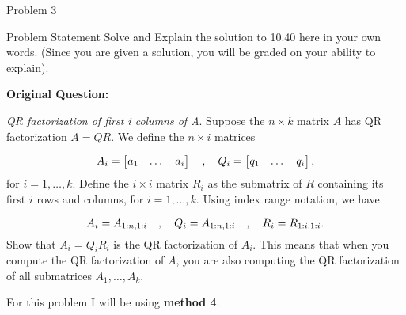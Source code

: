\begin{problem}{Problem 3}
    \begin{statement}{Problem Statement}
        Solve and Explain the solution to 10.40 here in your own words. (Since you are given a solution, you will be graded on your ability to explain). \vspace*{1em}

        \noindent \textbf{Original Question:} \vspace*{1em}

        \textit{QR factorization of first i columns of A}. Suppose the $n \times k$ matrix $A$ has QR factorization $A = QR$. We define the $n \times i$ matrices

        \setcounter{equation}{0}
        \begin{equation*}
            A_{i} = 
            \begin{bmatrix}
                a_{1} & \dots & a_{i}
            \end{bmatrix}
            \hspace*{10pt} , \hspace*{10pt}
            Q_{i} = 
            \begin{bmatrix}
                q_{1} & \dots & q_{i}
            \end{bmatrix},
        \end{equation*}
        for $i = 1,\dots,k$. Define the $i \times i$ matrix $R_{i}$ as the submatrix of $R$ containing its first $i$ rows and columns, for $i = 1,\dots,k$. Using index range notation, we have

        \begin{equation*}
            A_{i} = A_{1:n,1:i}
            \hspace*{10pt} , \hspace*{10pt}
            Q_{i} = A_{1:n,1:i}
            \hspace*{10pt} , \hspace*{10pt}
            R_{i} = R_{1:i,1:i}.
        \end{equation*}
        Show that $A_{i} = Q_{i}R_{i}$ is the QR factorization of $A_{i}$. This means that when you compute the QR factorization of $A$, you are also computing the QR factorization of all submatrices 
        $A_{1},\dots,A_{k}$.
    \end{statement}

    \begin{highlight}[Solution]
        \noindent For this problem I will be using \textbf{method 4}. \vspace*{1em}


\end{highlight}
\end{problem}
